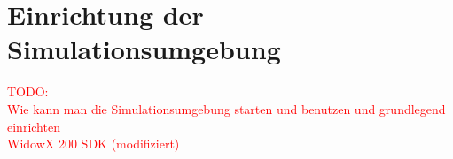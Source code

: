 



%
















\section{Einrichtung der Simulationsumgebung}\label{appendix1:Einrichtung_der_Simulationsumgebung}
\textcolor{red}{TODO:\\
Wie kann man die Simulationsumgebung starten und benutzen und grundlegend einrichten\\
WidowX 200 SDK (modifiziert)
}
